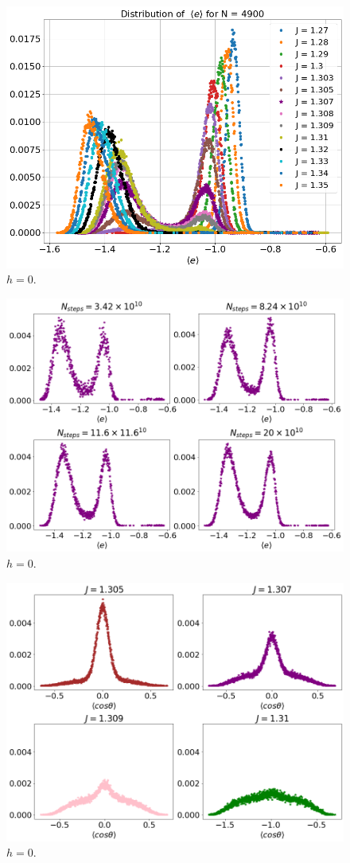 \begin{figure}[H]
 	\includegraphics[scale=0.25]{Images/distr_energy_4900.png}
 	\caption{$h=0$.  }
 	\label{fig:distributions}
 \end{figure}

 \begin{figure}[H]
	\centering
	\includegraphics[scale=0.36]{Images/distr_energy_4900_time.png}
	\caption{$h=0$.  }
	\label{fig:distributione4900}
\end{figure}

 \begin{figure}[H]
	\centering
	\includegraphics[scale=0.36]{Images/distr_cos_4900_J.png}
	\caption{$h=0$.  }
	\label{fig:distributioncos4900}
\end{figure}